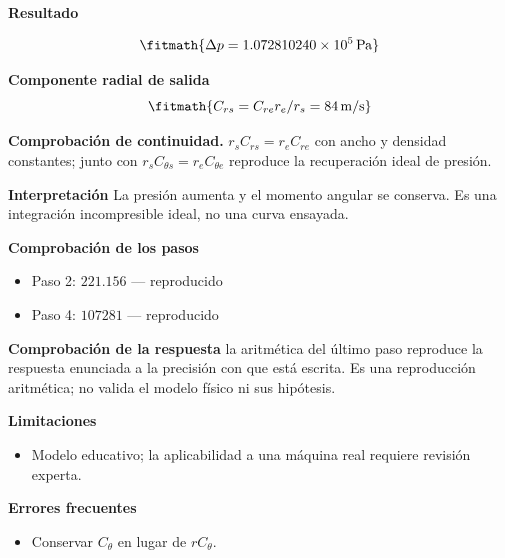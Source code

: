 \documentclass[10pt,openany]{book}
\begin{document}
\begin{tcolorbox}[title={Problema resuelto 1}, studiumworked, breakable]
\noindent\textbf{Resultado}

\[
\fitmath{\Delta p=1.072810240\times10^{5}\,\mathrm{Pa}}
\]

\noindent\textbf{Componente radial de salida}
\[
\fitmath{C_{rs}=C_{re}r_e/r_s=84\,\mathrm{m/s}}
\]

\noindent\textbf{Comprobación de continuidad.} $r_sC_{rs}=r_eC_{re}$ con ancho y densidad constantes; junto con $r_sC_{\theta s}=r_eC_{\theta e}$ reproduce la recuperación ideal de presión.

\noindent\textbf{Interpretación}
La presión aumenta y el momento angular se conserva. Es una integración incompresible ideal, no una curva ensayada.

\noindent\textbf{Comprobación de los pasos}
\begin{itemize}
\item Paso 2: $221.156$ — reproducido
\item Paso 4: $107281$ — reproducido
\end{itemize}

\noindent\textbf{Comprobación de la respuesta} la aritmética del último paso reproduce la respuesta enunciada a la precisión con que está escrita. Es una reproducción aritmética; no valida el modelo físico ni sus hipótesis.

\noindent\textbf{Limitaciones}
\begin{itemize}
\item Modelo educativo; la aplicabilidad a una máquina real requiere revisión experta.
\end{itemize}

\noindent\textbf{Errores frecuentes}
\begin{itemize}
\item Conservar $C_\theta$ en lugar de $rC_\theta$.
\end{itemize}
\end{tcolorbox}
\end{document}
